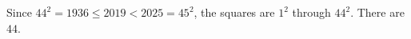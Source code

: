 Since $ 44^2=1936\le2019<2025=45^2 $, the squares are $ 1^2 $ through $ 44^2 $. There are $\boxed{44}$.
